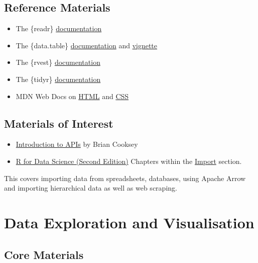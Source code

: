 \documentclass[
  letterpaper,
  DIV=11,
  numbers=noendperiod]{scrreprt}
\providecommand{\tightlist}{%
  \setlength{\itemsep}{0pt}\setlength{\parskip}{0pt}}\usepackage{longtable,booktabs,array}
\begin{document}
\subsection*{Reference Materials}\label{reference-materials-1}

\begin{itemize}
\item
  The \{readr\} \href{https://readr.tidyverse.org/}{documentation}
\item
  The \{data.table\}
  \href{https://cran.r-project.org/web/packages/data.table/data.table.pdf}{documentation}
  and
  \href{https://cran.r-project.org/web/packages/data.table/vignettes/datatable-intro.html}{vignette}
\item
  The \{rvest\} \href{https://rvest.tidyverse.org/}{documentation}
\item
  The \{tidyr\} \href{https://tidyr.tidyverse.org/}{documentation}
\item
  MDN Web Docs on
  \href{https://developer.mozilla.org/en-US/docs/Web/HTML}{HTML} and
  \href{https://developer.mozilla.org/en-US/docs/Web/CSS}{CSS}
\end{itemize}

\subsection*{Materials of Interest}\label{materials-of-interest-1}

\begin{itemize}
\tightlist
\item
  \href{https://zapier.com/learn/apis/chapter-1-introduction-to-apis/}{Introduction
  to APIs} by Brian Cooksey
\item
  \href{https://r4ds.hadley.nz/}{R for Data Science (Second Edition)}
  Chapters within the \href{https://r4ds.hadley.nz/import.html}{Import}
  section.
\end{itemize}

This covers importing data from spreadsheets, databases, using Apache
Arrow and importing hierarchical data as well as web scraping.

\section{Data Exploration and Visualisation}\label{edav-reading}

\subsection*{Core Materials}\label{core-materials-2}
\end{document}
